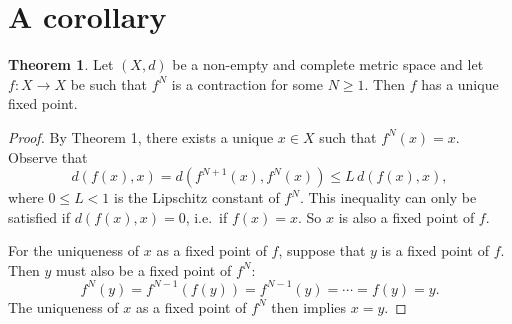 \documentclass[12pt]{article}
\newcommand{\newp}{\vspace{5mm}}
\theoremstyle{definition}
\newtheorem{theorem}{Theorem}
\begin{document}
\section{A corollary}

\begin{theorem}

Let \( (X, d) \) be a non-empty and complete metric space and let \( f : X \to X \) be such that \( f^N \) is a contraction for some \( N \geq 1 \). Then \( f \) has a unique fixed point.

\end{theorem}

\begin{proof}
By Theorem 1, there exists a unique \( x \in X \) such that \( f^N(x) = x \). Observe that
\[
    d(f(x), x) = d(f^{N+1}(x), f^N(x)) \leq L \, d(f(x), x),
\]
where \( 0 \leq L < 1 \) is the Lipschitz constant of \( f^N \). This inequality can only be satisfied if \( d(f(x), x) = 0 \), i.e.\ if \( f(x) = x \). So \( x \) is also a fixed point of \( f \).

\newp

For the uniqueness of \( x \) as a fixed point of \( f \), suppose that \( y \) is a fixed point of \( f \). Then \( y \) must also be a fixed point of \( f^N \):
\[
    f^N(y) = f^{N-1}(f(y)) = f^{N-1}(y) = \cdots = f(y) = y.
\]
The uniqueness of \( x \) as a fixed point of \( f^N \) then implies \( x = y \).
\end{proof}
\end{document}
